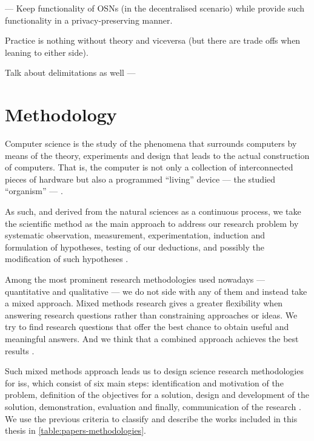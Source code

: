\documentclass[showtrims,oldfontcommands]{kthesis}
\begin{document}
---
Keep functionality of OSNs (in the decentralised scenario) while provide such functionality 
in a privacy-preserving manner.

Practice is nothing without theory and viceversa (but there are trade offs when leaning to either side).

Talk about delimitations as well
---

\section{Methodology}
    \label{section:methodoloy}
Computer science is the study of the phenomena that surrounds computers by means 
of the theory, experiments and design that leads to the actual construction of computers. 
That is, the computer is not only a collection of interconnected pieces of hardware 
but also a programmed ``living'' device --- the studied ``organism'' --- \cite{NewellS76}.

As such, and derived from the natural sciences as a continuous process, we take 
the scientific method as the main approach to address our research problem by systematic 
observation, measurement, experimentation, induction and formulation of hypotheses, 
testing of our deductions, and possibly the modification of such hypotheses \cite{Oxford14}.

Among the most prominent research methodologies used nowadays --- quantitative and 
qualitative --- we do not side with any of them and instead take a mixed approach. 
Mixed methods research gives a greater flexibility when answering research questions 
rather than constraining approaches or ideas. We try to find research questions 
that offer the best chance to obtain useful and meaningful answers. And we think 
that a combined approach achieves the best results \cite{JohnsonO04}.

Such mixed methods approach leads us to design science research methodologies for 
\acp{is}, which consist of six main steps: identification and motivation of the 
problem, definition of the objectives for a solution, design and development of 
the solution, demonstration, evaluation and finally, communication of the research 
\cite{PeffersTRC07}. We use the previous criteria to classify and describe the works 
included in this thesis in \cref{table:papers-methodologies}.
\end{document}
